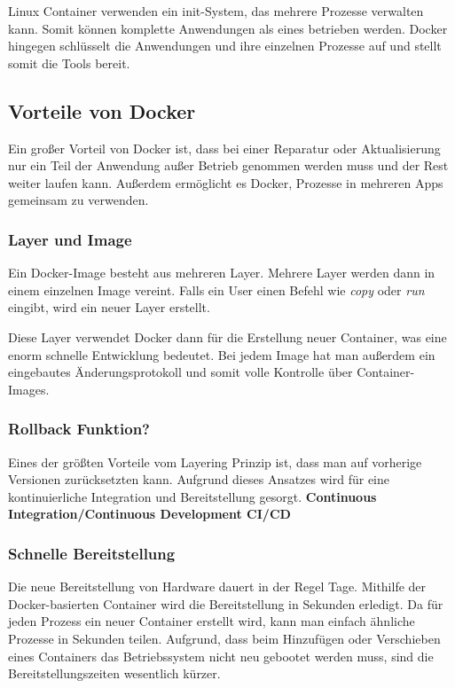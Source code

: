 Linux Container verwenden ein init-System, das mehrere Prozesse verwalten kann. Somit können
komplette Anwendungen als eines betrieben werden. Docker hingegen schlüsselt die Anwendungen und
ihre einzelnen Prozesse auf und stellt somit die Tools bereit.

\subsection{Vorteile von Docker}
Ein großer Vorteil von Docker ist, dass bei einer Reparatur oder
Aktualisierung nur ein Teil der Anwendung außer Betrieb genommen werden muss und
der Rest weiter laufen kann. Außerdem ermöglicht es Docker, Prozesse in mehreren
Apps gemeinsam zu verwenden.

\subsubsection{Layer und Image}
Ein Docker-Image besteht aus mehreren Layer. Mehrere Layer werden dann
in einem einzelnen Image vereint. Falls ein User einen Befehl wie \textit{copy}
oder \textit{run} eingibt, wird ein neuer Layer erstellt.

Diese Layer verwendet Docker dann für die Erstellung neuer Container, was eine enorm schnelle
Entwicklung bedeutet. Bei jedem Image hat man außerdem ein eingebautes Änderungsprotokoll
und somit volle Kontrolle über Container-Images.

\subsubsection{Rollback Funktion?}
Eines der größten Vorteile vom Layering Prinzip ist, dass man auf vorherige Versionen
zurücksetzten kann. Aufgrund dieses Ansatzes wird für eine kontinuierliche Integration und
Bereitstellung gesorgt. \textbf{Continuous Integration/Continuous Development CI/CD}
\label{CI/CD}

\subsubsection{Schnelle Bereitstellung}
Die neue Bereitstellung von Hardware dauert in der Regel Tage. Mithilfe der Docker-basierten
Container wird die Bereitstellung in Sekunden erledigt. Da für jeden Prozess ein neuer Container
erstellt wird, kann man einfach ähnliche Prozesse in Sekunden teilen. Aufgrund, dass beim Hinzufügen
oder Verschieben eines Containers das Betriebssystem nicht neu gebootet werden muss, sind die
Bereitstellungszeiten wesentlich kürzer.

\cite{Docker}